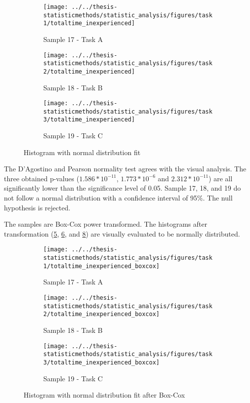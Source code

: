 \begin{figure}[H]
	\centering
	\begin{subfigure}[b]{0.32\textwidth}
		\centering
		\texttt{[image: ../../thesis-statisticmethods/statistic\_analysis/figures/task1/totaltime\_inexperienced]}
		\caption{Sample 17 - Task A}
		\label{fig:totaltimeinexperienced_task1}
	\end{subfigure}
	\begin{subfigure}[b]{0.32\textwidth}
		\centering
		\texttt{[image: ../../thesis-statisticmethods/statistic\_analysis/figures/task2/totaltime\_inexperienced]}
		\caption{Sample 18 - Task B}
		\label{fig:totaltimeinexperienced_task2}
	\end{subfigure}
	\begin{subfigure}[b]{0.32\textwidth}
		\centering
		\texttt{[image: ../../thesis-statisticmethods/statistic\_analysis/figures/task3/totaltime\_inexperienced]}
		\caption{Sample 19 - Task C}
		\label{fig:totaltimeinexperienced_task3}
	\end{subfigure}
	\caption{Histogram with normal distribution fit}
\end{figure}

The D'Agostino and Pearson normality test agrees with the visual analysis. The three obtained p-values ($1.586 * 10^{-11}$, $1.773 * 10^{-6}$ and $2.312 * 10 ^{-11}$) are all significantly lower than the significance level of 0.05. Sample 17, 18, and 19 do not follow a normal distribution with a confidence interval of 95\%. The null hypothesis is rejected. 

The samples are Box-Cox power transformed. The histograms after transformation (\ref{fig:totaltimeinexperiencedboxcox_task1}, \ref{fig:totaltimeinexperiencedboxcox_task2}, and \ref{fig:totaltimeinexperiencedboxcox_task3}) are visually evaluated to be normally distributed. 

\begin{figure}[H]
	\centering
	\begin{subfigure}[b]{0.32\textwidth}
		\centering
		\texttt{[image: ../../thesis-statisticmethods/statistic\_analysis/figures/task1/totaltime\_inexperienced\_boxcox]}
		\caption{Sample 17 - Task A}
		\label{fig:totaltimeinexperiencedboxcox_task1}
	\end{subfigure}
	\begin{subfigure}[b]{0.32\textwidth}
		\centering
		\texttt{[image: ../../thesis-statisticmethods/statistic\_analysis/figures/task2/totaltime\_inexperienced\_boxcox]}
		\caption{Sample 18 - Task B}
		\label{fig:totaltimeinexperiencedboxcox_task2}
	\end{subfigure}
	\begin{subfigure}[b]{0.32\textwidth}
		\centering
		\texttt{[image: ../../thesis-statisticmethods/statistic\_analysis/figures/task3/totaltime\_inexperienced\_boxcox]}
		\caption{Sample 19 - Task C}
		\label{fig:totaltimeinexperiencedboxcox_task3}
	\end{subfigure}
	\caption{Histogram with normal distribution fit after Box-Cox}
\end{figure}

